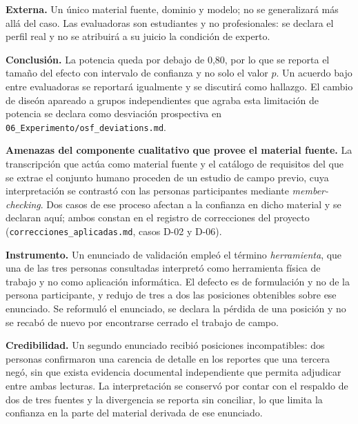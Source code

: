 \documentclass[runningheads]{llncs}
\begin{document}
\textbf{Externa.} Un \'unico material fuente, dominio y modelo; no se generalizar\'a
m\'as all\'a del caso. Las evaluadoras son estudiantes y no profesionales: se declara
el perfil real y no se atribuir\'a a su juicio la condici\'on de experto.

\textbf{Conclusi\'on.} La potencia queda por debajo de 0,80, por lo que se reporta
el tama\~no del efecto con intervalo de confianza y no solo el valor $p$. Un acuerdo
bajo entre evaluadoras se reportar\'a igualmente y se discutir\'a como hallazgo. El cambio 
de dise\'on apareado a grupos independientes que agraba esta limitaci\'on de potencia se
declara como desviaci\'on prospectiva en \texttt{06\_Experimento/osf\_deviations.md}.

\medskip
\noindent\textbf{Amenazas del componente cualitativo que provee el material fuente.}
La transcripci\'on que act\'ua como material fuente y el cat\'alogo de requisitos del
que se extrae el conjunto humano proceden de un estudio de campo previo, cuya
interpretaci\'on se contrast\'o con las personas participantes mediante
\emph{member-checking}. Dos casos de ese proceso afectan a la confianza en dicho
material y se declaran aqu\'i; ambos constan en el registro de correcciones del
proyecto (\texttt{correcciones\_aplicadas.md}, casos D-02 y D-06).

\textbf{Instrumento.} Un enunciado de validaci\'on emple\'o el t\'ermino
\emph{herramienta}, que una de las tres personas consultadas interpret\'o como
herramienta f\'isica de trabajo y no como aplicaci\'on inform\'atica. El defecto es
de formulaci\'on y no de la persona participante, y redujo de tres a dos las
posiciones obtenibles sobre ese enunciado. Se reformul\'o el enunciado, se declara
la p\'erdida de una posici\'on y no se recab\'o de nuevo por encontrarse cerrado el
trabajo de campo.

\textbf{Credibilidad.} Un segundo enunciado recibi\'o posiciones incompatibles: dos
personas confirmaron una carencia de detalle en los reportes que una tercera neg\'o,
sin que exista evidencia documental independiente que permita adjudicar entre ambas
lecturas. La interpretaci\'on se conserv\'o por contar con el respaldo de dos de tres
fuentes y la divergencia se reporta sin conciliar, lo que limita la confianza en la
parte del material derivada de ese enunciado.
\end{document}
